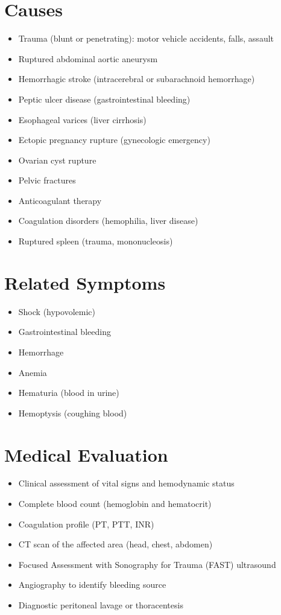 \section*{Causes}
\begin{itemize}
\item Trauma (blunt or penetrating): motor vehicle accidents, falls, assault
\item Ruptured abdominal aortic aneurysm
\item Hemorrhagic stroke (intracerebral or subarachnoid hemorrhage)
\item Peptic ulcer disease (gastrointestinal bleeding)
\item Esophageal varices (liver cirrhosis)
\item Ectopic pregnancy rupture (gynecologic emergency)
\item Ovarian cyst rupture
\item Pelvic fractures
\item Anticoagulant therapy
\item Coagulation disorders (hemophilia, liver disease)
\item Ruptured spleen (trauma, mononucleosis)
\end{itemize}

\section*{Related Symptoms}
\begin{itemize}
\item Shock (hypovolemic)
\item Gastrointestinal bleeding
\item Hemorrhage
\item Anemia
\item Hematuria (blood in urine)
\item Hemoptysis (coughing blood)
\end{itemize}

\section*{Medical Evaluation}
\begin{itemize}
\item Clinical assessment of vital signs and hemodynamic status
\item Complete blood count (hemoglobin and hematocrit)
\item Coagulation profile (PT, PTT, INR)
\item CT scan of the affected area (head, chest, abdomen)
\item Focused Assessment with Sonography for Trauma (FAST) ultrasound
\item Angiography to identify bleeding source
\item Diagnostic peritoneal lavage or thoracentesis
\end{itemize}

